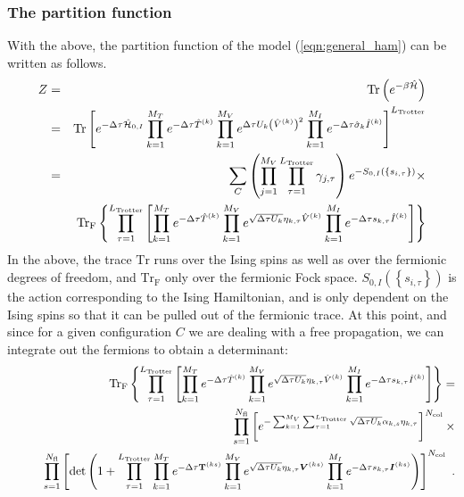 \subsubsection{The partition function}
With the above, the partition function of the model (\ref{eqn:general_ham}) can be written as follows.
\begin{eqnarray}
Z &=& \mathop{\mathrm{Tr}}{\left(e^{-\beta \hat{\mathcal{H}} }\right)}\nonumber\\
  &=&   \mathop{\mathrm{Tr}}{  \left[ e^{-\Delta \tau \hat{\mathcal{H}}_{0,I}}   \prod_{k=1}^{M_T}   e^{-\Delta \tau \hat{T}^{(k)}}  
    \prod_{k=1}^{M_V}   e^{  \Delta \tau  U_k \left(  \hat{V}^{(k)} \right)^2}   \prod_{k=1}^{M_I}   e^{  -\Delta \tau  \hat{\sigma}_{k}  \hat{I}^{(k)}} 
   \right]^{L_{\text{Trotter}}}}  \nonumber \\
   &=&
   \sum_{C} \left( \prod_{j=1}^{M_V} \prod_{\tau=1}^{L_{\mathrm{Trotter}}} \gamma_{j,\tau} \right) e^{-S_{0,I} \left( \left\{ s_{i,\tau} \right\}  \right) }\times \nonumber\\
   &\quad&
    \mathop{\mathrm{Tr}_{\mathrm{F}}}{ \left\{  \prod_{\tau=1}^{L_{\mathrm{Trotter}}} \left[   \prod_{k=1}^{M_T}   e^{-\Delta \tau \hat{T}^{(k)}}  
    \prod_{k=1}^{M_V}   e^{  \sqrt{ \Delta \tau  U_k} \eta_{k,\tau} \hat{V}^{(k)} }   \prod_{k=1}^{M_I}   e^{  -\Delta \tau s_{k,\tau}  \hat{I}^{(k)}}  \right]\right\} }
\end{eqnarray}
In the above,  the trace $\mathrm{Tr} $  runs over the Ising spins as well as over the fermionic degrees of freedom, and $ \mathrm{Tr}_{\mathrm{F}}  $ only over the  fermionic Fock space. 
$S_{0,I} \left( \left\{ s_{i,\tau} \right\}  \right)  $ is the action  corresponding to the Ising Hamiltonian,  and is only dependent on the Ising spins so that  it can be pulled out of the fermionic trace.
At this point,  and  since for a given configuration $C$  we are dealing with a free propagation, we can integrate out the fermions to obtain a determinant: 
\begin{eqnarray}
 &\quad&\mathop{\mathrm{Tr}_{\mathrm{F}}}{ \left\{  \prod_{\tau=1}^{L_{\mathrm{Trotter}}} \left[   \prod_{k=1}^{M_T}   e^{-\Delta \tau \hat{T}^{(k)}}  
    \prod_{k=1}^{M_V}   e^{  \sqrt{ \Delta \tau  U_k} \eta_{k,\tau} \hat{V}^{(k)} }   \prod_{k=1}^{M_I}   e^{  -\Delta \tau s_{k,\tau}  \hat{I}^{(k)}}  \right] \right\}} = \nonumber\\
&\quad& \quad\prod\limits_{s=1}^{N_{\mathrm{fl}}} \left[  e^{- \sum_{k=1}^{M_V} \sum_{\tau = 1}^{L_{\mathrm{Trotter}}}\sqrt{\Delta \tau U_k}  \alpha_{k,s} \eta_{k,\tau} }
   \right]^{N_{\mathrm{col}}}\times
\nonumber\\
&\quad&\quad   \prod\limits_{s=1}^{N_{\mathrm{fl}}} 
   \left[
    \det\left(  1 + 
     \prod_{\tau=1}^{L_{\mathrm{Trotter}}}   \prod_{k=1}^{M_T}   e^{-\Delta \tau {\bf T}^{(ks)}}  
    \prod_{k=1}^{M_V}   e^{  \sqrt{ \Delta \tau  U_k} \eta_{k,\tau} {\bm V}^{(ks)} }   \prod_{k=1}^{M_I}   e^{  -\Delta \tau s_{k,\tau}  {\bm I}^{(ks)}}  
     \right) \right]^{N_{\mathrm{col}}}\;.
\end{eqnarray}
